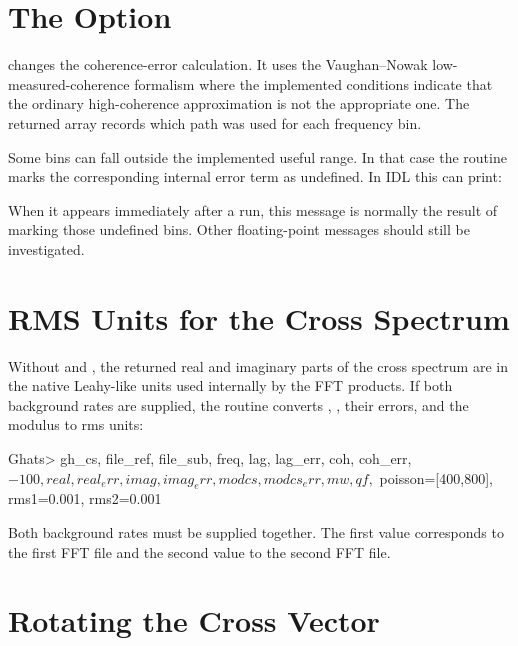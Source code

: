 \section{The  Option}

 changes the coherence-error calculation.  It uses the
Vaughan--Nowak low-measured-coherence formalism where the implemented
conditions indicate that the ordinary high-coherence approximation is not the
appropriate one.  The returned  array records which path was used
for each frequency bin.

Some bins can fall outside the implemented useful range.  In that case the
routine marks the corresponding internal error term as undefined.  In IDL this
can print:

\begin{ghatsconsole}
\end{ghatsconsole}

When it appears immediately after a  run, this message is
normally the result of marking those undefined bins.  Other floating-point
messages should still be investigated.

\section{RMS Units for the Cross Spectrum}

Without  and , the returned real and imaginary parts
of the cross spectrum are in the native Leahy-like units used internally by
the FFT products.  If both background rates are supplied, the routine converts
, , their errors, and the modulus to rms units:

\begin{ghatsconsole}
Ghats> gh_cs, file_ref, file_sub, freq, lag, lag_err, coh, coh_err, $
       -100, real, real_err, imag, imag_err, modcs, modcs_err, mw, qf, $
       poisson=[400,800], rms1=0.001, rms2=0.001
\end{ghatsconsole}

Both background rates must be supplied together.  The first value corresponds
to the first FFT file and the second value to the second FFT file.

\section{Rotating the Cross Vector}

